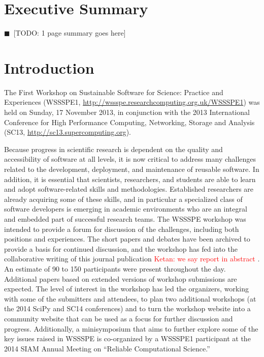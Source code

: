 \documentclass[11pt, oneside]{amsart}
\newcommand{\todo}[1]{{\color{blue}$\blacksquare$~\textsf{[TODO: #1]}}}
\newcommand{\note}[1]{ {\textcolor{red}    { #1 }}}
\begin{document}
\pagebreak

\section*{Executive Summary}

\todo{1 page summary goes here}

\pagebreak

\section{Introduction}

The First Workshop on Sustainable Software for Science: Practice and
Experiences (WSSSPE1,
\url{http://wssspe.researchcomputing.org.uk/WSSSPE1}) was held on
Sunday, 17 November 2013, in conjunction with the 2013 International
Conference for High Performance Computing, Networking, Storage and
Analysis (SC13, \url{http://sc13.supercomputing.org}).

Because progress in scientific research is dependent on the quality and
accessibility of software at all levels, it is now critical to address many
challenges related to the development, deployment, and maintenance of reusable
software.
In addition, it is essential that scientists,
researchers, and students are able to learn and adopt software-related skills
and methodologies. Established researchers are already acquiring some of these
skills, and in particular a specialized class of software developers is
emerging in academic environments who are an integral and embedded part of
successful research teams. The WSSSPE workshop was intended to provide a forum
for discussion of the challenges, including both positions and experiences. The
short papers and debates have been archived to provide a basis for continued
discussion, and the workshop has fed into the collaborative writing of this
journal publication \note{Ketan: we say report in abstract}. An estimate of 90 to 150 participants were present
throughout the day. Additional papers based on extended versions of workshop
submissions are expected. The level of interest in the workshop has led the
organizers, working with some of the submitters and attendees, to plan two
additional workshops (at the 2014 SciPy and SC14 conferences) and to turn the
workshop website into a community website that can be used as a focus for
further discussion and progress. Additionally, a minisymposium that aims to
further explore some of the key issues raised in WSSSPE is co-organized by a
WSSSPE1 participant at the 2014 SIAM Annual Meeting on ``Reliable
Computational Science.''
\end{document}
